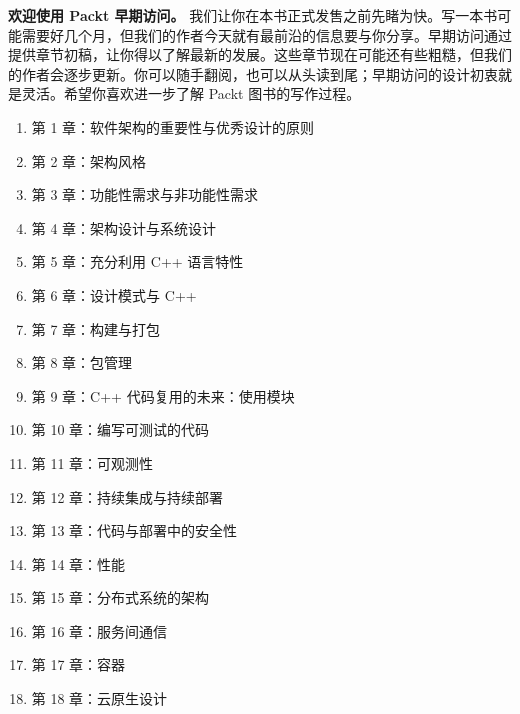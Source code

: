 \textbf{ 欢迎使用 Packt 早期访问。 } 我们让你在本书正式发售之前先睹为快。写一本书可能需要好几个月，但我们的作者今天就有最前沿的信息要与你分享。早期访问通过提供章节初稿，让你得以了解最新的发展。这些章节现在可能还有些粗糙，但我们的作者会逐步更新。你可以随手翻阅，也可以从头读到尾；早期访问的设计初衷就是灵活。希望你喜欢进一步了解 Packt 图书的写作过程。

\begin{enumerate}
\item 第 1 章：软件架构的重要性与优秀设计的原则
\item 第 2 章：架构风格
\item 第 3 章：功能性需求与非功能性需求
\item 第 4 章：架构设计与系统设计
\item 第 5 章：充分利用 C++ 语言特性
\item 第 6 章：设计模式与 C++
\item 第 7 章：构建与打包
\item 第 8 章：包管理
\item 第 9 章：C++ 代码复用的未来：使用模块
\item 第 10 章：编写可测试的代码
\item 第 11 章：可观测性
\item 第 12 章：持续集成与持续部署
\item 第 13 章：代码与部署中的安全性
\item 第 14 章：性能
\item 第 15 章：分布式系统的架构
\item 第 16 章：服务间通信
\item 第 17 章：容器
\item 第 18 章：云原生设计
\end{enumerate}
